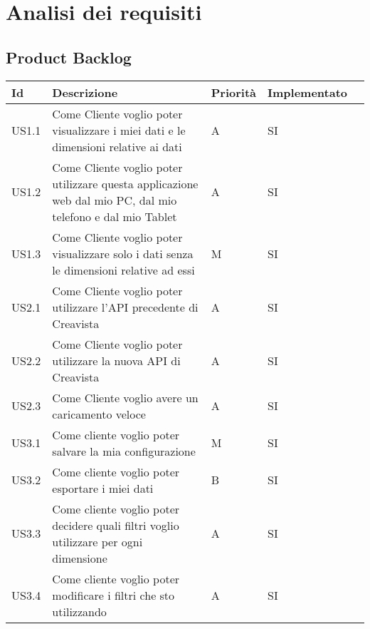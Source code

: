 
\chapter{Analisi dei requisiti}
\label{cap:analisi-requisiti}

\section{Product Backlog}
\begin{longtable} {
		|>{}p{10mm}| 
		|>{}p{70mm}|
		|>{}p{15mm}|
		|>{}p{25mm}|
		>{}p{0mm}}
	\hline
	\textbf{Id} & \textbf{Descrizione} & \textbf{Priorità} & \textbf{Implementato} \\ \hline
	US1.1 & Come Cliente voglio poter visualizzare i miei dati e le dimensioni relative ai dati & A & SI \\ \hline
	US1.2 & Come Cliente voglio poter utilizzare questa applicazione web dal mio PC, dal mio telefono e dal mio Tablet & A & SI \\ \hline
	US1.3 & Come Cliente voglio poter visualizzare solo i dati senza le dimensioni relative ad essi & M & SI \\ \hline
	US2.1 & Come Cliente voglio poter utilizzare l'API precedente di Creavista & A & SI \\ \hline
	US2.2 & Come Cliente voglio poter utilizzare la nuova API di Creavista & A & SI \\ \hline
	US2.3 & Come Cliente voglio avere un caricamento veloce & A & SI \\ \hline
	US3.1 & Come cliente voglio poter salvare la mia configurazione & M & SI \\ \hline
	US3.2 & Come cliente voglio poter esportare i miei dati & B & SI \\ \hline
	US3.3 & Come cliente voglio poter decidere quali filtri voglio utilizzare per ogni dimensione & A & SI \\ \hline
	US3.4 & Come cliente voglio poter modificare i filtri che sto utilizzando & A & SI \\ \hline
	\hline
\end{longtable}
\newpage
